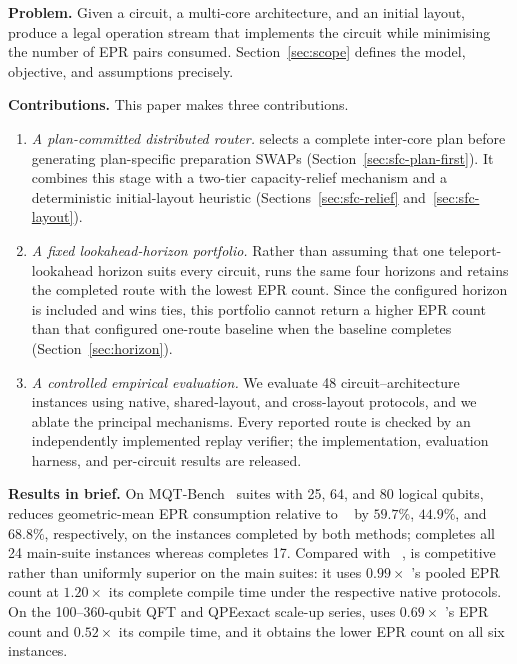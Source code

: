 \textbf{Problem.} Given a circuit, a multi-core architecture, and an initial
layout, produce a legal operation stream that implements the circuit while
minimising the number of EPR pairs consumed. Section~\ref{sec:scope}
defines the model, objective, and assumptions precisely.

\textbf{Contributions.} This paper makes three contributions.

\begin{enumerate}[leftmargin=1.5em,itemsep=2pt,topsep=2pt,label=(\roman*)]
\item \emph{A plan-committed distributed router.} \PORTER{} selects a
complete inter-core plan before generating plan-specific preparation
SWAPs (Section~\ref{sec:sfc-plan-first}). It combines this stage with a
two-tier capacity-relief mechanism and a deterministic initial-layout
heuristic (Sections~\ref{sec:sfc-relief} and~\ref{sec:sfc-layout}).
\item \emph{A fixed lookahead-horizon portfolio.} Rather than assuming that
one teleport-lookahead horizon suits every circuit, \PORTER{} runs
the same four horizons and retains the completed route with the lowest EPR
count. Since the configured horizon is included and wins ties, this
portfolio cannot return a higher EPR count than that configured one-route
baseline when the baseline completes (Section~\ref{sec:horizon}).
\item \emph{A controlled empirical evaluation.} We evaluate 48
circuit--architecture instances using native, shared-layout, and
cross-layout protocols, and we ablate the principal mechanisms.
Every reported \PORTER{} route is checked by an independently implemented
replay verifier; the implementation, evaluation harness, and per-circuit
results are released.
\end{enumerate}

\textbf{Results in brief.} On MQT-Bench~\cite{quetschlich2023mqtbench}
suites with 25, 64, and 80 logical
qubits, \PORTER{} reduces geometric-mean EPR consumption relative to
\TeleSABRE{}~\cite{russo2025telesabre} by $59.7\%$, $44.9\%$, and
$68.8\%$, respectively, on the
instances completed by both methods; \PORTER{} completes all 24 main-suite
instances whereas \TeleSABRE{} completes 17. Compared with
\dSABRE{}~\cite{lidsabre},
\PORTER{} is competitive rather than uniformly superior on the main suites:
it uses $0.99\times$ \dSABRE{}'s pooled EPR count at $1.20\times$ its
complete compile time under the respective native protocols. On the
100--360-qubit QFT and QPEexact scale-up series, \PORTER{} uses
$0.69\times$ \dSABRE{}'s EPR count and $0.52\times$ its compile time,
and it obtains the lower EPR count on all six instances.

